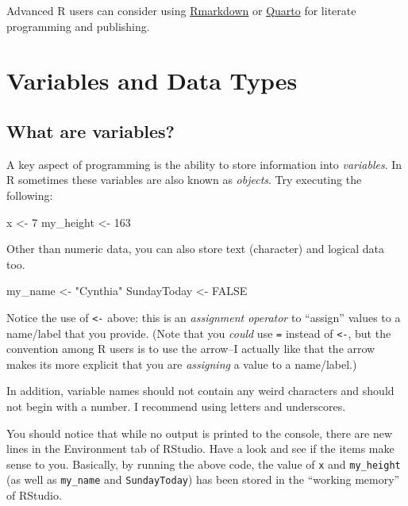 \documentclass[
]{book}
\newenvironment{Shaded}{\begin{snugshade}}{\end{snugshade}}
\newcommand{\ConstantTok}[1]{\textcolor[rgb]{0.56,0.35,0.01}{#1}}
\newcommand{\DecValTok}[1]{\textcolor[rgb]{0.00,0.00,0.81}{#1}}
\newcommand{\NormalTok}[1]{#1}
\newcommand{\OtherTok}[1]{\textcolor[rgb]{0.56,0.35,0.01}{#1}}
\newcommand{\StringTok}[1]{\textcolor[rgb]{0.31,0.60,0.02}{#1}}
\begin{document}
Advanced R users can consider using \href{https://rmarkdown.rstudio.com/articles_intro.html}{Rmarkdown} or \href{https://quarto.org/}{Quarto} for literate programming and publishing.

\section{Variables and Data Types}\label{variables-and-data-types}

\subsection{What are variables?}\label{what-are-variables}

A key aspect of programming is the ability to store information into \emph{variables}. In R sometimes these variables are also known as \emph{objects}. Try executing the following:

\begin{Shaded}
\begin{Highlighting}[]
\NormalTok{x }\OtherTok{\textless{}{-}} \DecValTok{7}
\NormalTok{my\_height }\OtherTok{\textless{}{-}} \DecValTok{163}
\end{Highlighting}
\end{Shaded}

Other than numeric data, you can also store text (character) and logical data too.

\begin{Shaded}
\begin{Highlighting}[]
\NormalTok{my\_name }\OtherTok{\textless{}{-}} \StringTok{"Cynthia"}
\NormalTok{SundayToday }\OtherTok{\textless{}{-}} \ConstantTok{FALSE}
\end{Highlighting}
\end{Shaded}

Notice the use of \texttt{\textless{}-} above: this is an \emph{assignment operator} to ``assign'' values to a name/label that you provide. (Note that you \emph{could} use \texttt{=} instead of \texttt{\textless{}-}, but the convention among R users is to use the arrow--I actually like that the arrow makes its more explicit that you are \emph{assigning} a value to a name/label.)

In addition, variable names should not contain any weird characters and should not begin with a number. I recommend using letters and underscores.

You should notice that while no output is printed to the console, there are new lines in the Environment tab of RStudio. Have a look and see if the items make sense to you. Basically, by running the above code, the value of \texttt{x} and \texttt{my\_height} (as well as \texttt{my\_name} and \texttt{SundayToday}) has been stored in the ``working memory'' of RStudio.
\end{document}
